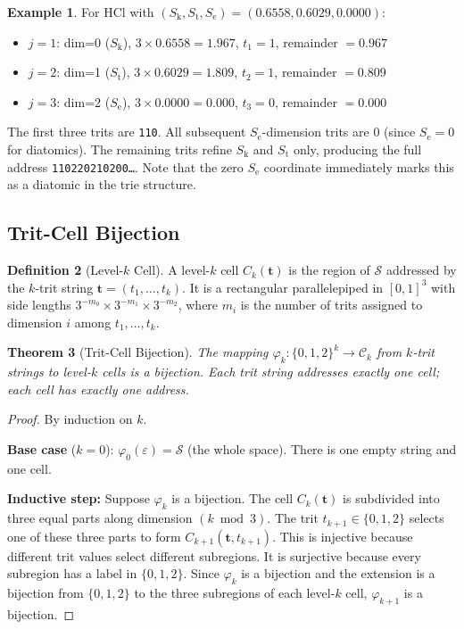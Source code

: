 \documentclass[11pt,twocolumn,a4paper]{article}
\newtheorem{theorem}{Theorem}[section]
\theoremstyle{definition}
\newtheorem{definition}[theorem]{Definition}
\newtheorem{example}[theorem]{Example}
\theoremstyle{remark}
\newcommand{\Sk}{S_{\mathrm{k}}}
\newcommand{\St}{S_{\mathrm{t}}}
\newcommand{\Se}{S_{\mathrm{e}}}
\newcommand{\Sspace}{\mathcal{S}}
\begin{document}
\begin{example}
For HCl with $(\Sk, \St, \Se) = (0.6558, 0.6029, 0.0000)$:
\begin{itemize}[nosep]
\item $j=1$: dim=0 ($\Sk$), $3 \times 0.6558 = 1.967$, $t_1 = 1$, remainder $= 0.967$
\item $j=2$: dim=1 ($\St$), $3 \times 0.6029 = 1.809$, $t_2 = 1$, remainder $= 0.809$
\item $j=3$: dim=2 ($\Se$), $3 \times 0.0000 = 0.000$, $t_3 = 0$, remainder $= 0.000$
\end{itemize}
The first three trits are \texttt{110}. All subsequent $\Se$-dimension trits are 0 (since $\Se = 0$ for diatomics). The remaining trits refine $\Sk$ and $\St$ only, producing the full address \texttt{110220210200\ldots}. Note that the zero $\Se$ coordinate immediately marks this as a diatomic in the trie structure.
\end{example}

\subsection{Trit-Cell Bijection}

\begin{definition}[Level-$k$ Cell]
\label{def:cell}
A level-$k$ cell $C_k(\mathbf{t})$ is the region of $\Sspace$ addressed by the $k$-trit string $\mathbf{t} = (t_1, \ldots, t_k)$. It is a rectangular parallelepiped in $[0,1]^3$ with side lengths $3^{-m_0} \times 3^{-m_1} \times 3^{-m_2}$, where $m_i$ is the number of trits assigned to dimension $i$ among $t_1, \ldots, t_k$.
\end{definition}

\begin{theorem}[Trit-Cell Bijection]
\label{thm:bijection}
The mapping $\varphi_k: \{0,1,2\}^k \to \mathcal{C}_k$ from $k$-trit strings to level-$k$ cells is a bijection. Each trit string addresses exactly one cell; each cell has exactly one address.
\end{theorem}

\begin{proof}
By induction on $k$.

\textbf{Base case} ($k = 0$): $\varphi_0(\varepsilon) = \Sspace$ (the whole space). There is one empty string and one cell.

\textbf{Inductive step:} Suppose $\varphi_k$ is a bijection. The cell $C_k(\mathbf{t})$ is subdivided into three equal parts along dimension $(k \bmod 3)$. The trit $t_{k+1} \in \{0, 1, 2\}$ selects one of these three parts to form $C_{k+1}(\mathbf{t}, t_{k+1})$. This is injective because different trit values select different subregions. It is surjective because every subregion has a label in $\{0, 1, 2\}$. Since $\varphi_k$ is a bijection and the extension is a bijection from $\{0,1,2\}$ to the three subregions of each level-$k$ cell, $\varphi_{k+1}$ is a bijection.
\end{proof}
\end{document}
